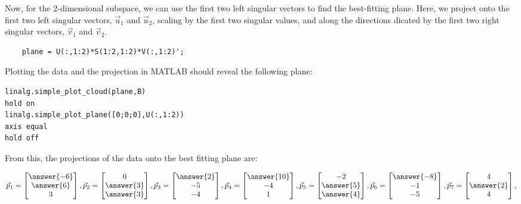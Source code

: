 \documentclass{ximera}
\begin{document}
\begin{problem}
  Now, for the 2-dimensional subspace, we can use the first two left singular vectors to find the best-fitting plane. Here, we project onto the first two left singular vectors, $\vec{u}_1$ and $\vec{u}_2$, scaling by the first two singular values, and along the directions dicated by the first two right singular vectors, $\vec{v}_1$ and $\vec{v}_2$.

  \begin{verbatim}
    plane = U(:,1:2)*S(1:2,1:2)*V(:,1:2)';
  \end{verbatim}

Plotting the data and the projection in MATLAB should reveal the following plane:

  \begin{verbatim}
linalg.simple_plot_cloud(plane,B)
hold on
linalg.simple_plot_plane([0;0;0],U(:,1:2))
axis equal
hold off
  \end{verbatim}

  From this, the projections of the data onto the best fitting plane are: 

  $$\vec{p}_1=\begin{bmatrix}
    \answer{-6}\\\answer{6}\\3
  \end{bmatrix},\vec{p}_2=\begin{bmatrix}
    0\\\answer{3}\\\answer{3}
  \end{bmatrix},\vec{p}_3=\begin{bmatrix}
    \answer{2}\\-5\\-4
  \end{bmatrix},\vec{p}_4=\begin{bmatrix}
    \answer{10}\\-4\\1
  \end{bmatrix},\vec{p}_5=\begin{bmatrix}
    -2\\\answer{5}\\\answer{4}
  \end{bmatrix},\vec{p}_6=\begin{bmatrix}
    \answer{-8}\\-1\\-5
  \end{bmatrix},\vec{p}_7=\begin{bmatrix}
    4\\\answer{2}\\4
  \end{bmatrix},$$
  

\end{problem}
\end{document}
